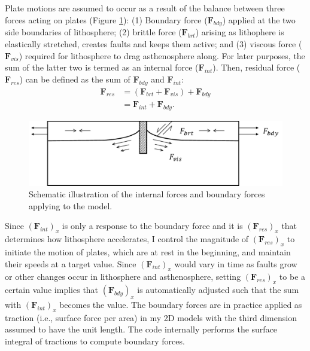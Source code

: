 \documentclass[letterpaper,12pt,notitle]{memphisthesis}                     %
\begin{document}
Plate motions are assumed to occur as a result of the balance between three forces acting on plates (Figure \ref{fig:forcescheme}): (1) Boundary force ($\mathbf{F}_{bdy}$) applied at the two side boundaries of lithosphere; (2) brittle force ($\boldsymbol{F}_{brt}$) arising as lithophere is elastically stretched, creates faults and keeps them active; %
and (3) viscous force ($\boldsymbol{F}_{vis}$) required for lithosphere to drag asthenosphere along. 
For later purposes, the sum of the latter two is termed as an internal force ($\boldsymbol{F}_{int}$). Then, residual force ($\boldsymbol{F}_{res}$) can be defined as the sum of $\boldsymbol{F}_{bdy}$ and $\boldsymbol{F}_{int}$:
%
\begin{align} \label{Fres}
\mathbf{F}_{res} & = (\mathbf{F}_{brt} + \mathbf{F}_{vis}) + \mathbf{F}_{bdy} \\
 & = \mathbf{F}_{int} + \mathbf{F}_{bdy}.
\end{align}
%
\begin{figure}[!htb]
	\centering
	\includegraphics[width=0.7\linewidth]{./figs/force.pdf}
	\caption{Schematic illustration of the internal forces and boundary forces applying to the model.}
	\label{fig:forcescheme}
\end{figure}

Since $(\boldsymbol{F}_{int})_{x}$ is only a response to the boundary force and it is $(\boldsymbol{F}_{res})_{x}$ that determines how lithosphere accelerates, I control the magnitude of $(\boldsymbol{F}_{res})_{x}$ to initiate the motion of plates, which are at rest in the beginning, and maintain their speeds at a target value. Since $(\boldsymbol{F}_{int})_{x}$ would vary in time as faults grow or other changes occur in lithosphere and asthenosphere, setting $(\boldsymbol{F}_{res})_{x}$ %
to be a certain value implies that $(\boldsymbol{F}_{bdy})_{x}$ is automatically adjusted such that the sum with $(\boldsymbol{F}_{int})_{x}$ becomes the value. The boundary forces are in practice applied as traction (i.e., surface force per area) in my 2D models with the third dimension assumed to have the unit length. The code internally performs the surface integral of tractions to compute boundary forces.
\end{document}
